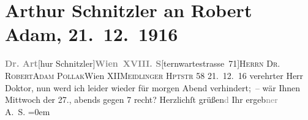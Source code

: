 

         
         \renewcommand{\erwaehntePersonen}{Personen: Robert Adam}
         \renewcommand{\erwaehnteOrte}{Orte: Meidlinger Hauptstraße, Sternwartestraße, Wien, XII., Meidling, XVIII., Währing}
         \renewcommand{\erwaehnteWerke}{}
               \section[Arthur Schnitzler an Robert Adam, 21. 12. 1916]{ Arthur Schnitzler an Robert Adam, 21. 12. 1916}\nopagebreak{}\rehead{ }\begin{ledgroupsized}[t]{13cm}\normalsize\beginnumbering{} \toendnotes[C]{\smallbreak\pagebreak[2]} 
\pstart{}{\pb}\textcolor{gray}{\textbf{Dr. Art}}{[}hur Schnitzler{]}\pend{}\pstart{}\textcolor{gray}{\textbf{Wien XVIII. S}}{[}ternwartestrasse 71{]}\pend{}{\bigskip}\pstart{}\textsc{Herrn Dr. Robert}\pend{}\pstart{}\textsc{Adam Pollak}\pend{}\pstart{}Wien XII\pend{}\pstart{}\textsc{Meidlinger Hptstr} 58\pend{}{\bigskip}\pstart
           \raggedleft{}{\pb}21. 12. 16\pend
           \pstart
           verehrter Herr Doktor, nun werd ich leider wieder für morgen Abend
               verhindert; – wär Ihnen Mittwoch der 27., abends gegen 7
               recht?\pend
           \pstart
           Herzlichſt grüßen\textcolor{gray}{d} Ihr ergeb\textcolor{gray}{ner}{\\[\baselineskip]}\spacefill\mbox{A. S.}\pend
           \leftskip=0em{}
         
         \endnumbering{}\end{ledgroupsized}  \newcommand{\dateiname}{L02252}\newcommand{\titel}{Arthur Schnitzler an Robert Adam, 21. 12. 1916}\newcommand{\editorInnen}{Martin Anton Müller und Gerd-Hermann Susen}
      